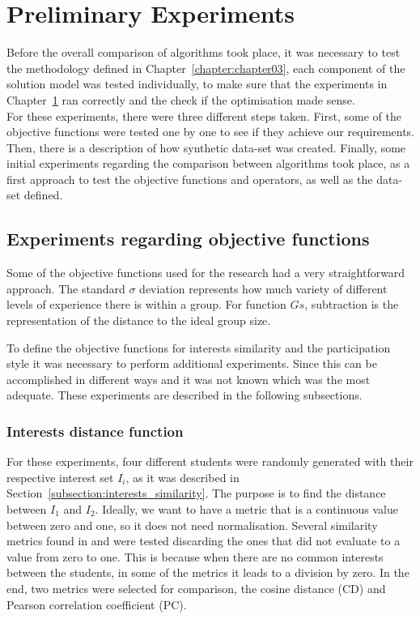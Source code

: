 \chapter{Preliminary Experiments}
\label{chapter:chapter04}

Before the overall comparison of algorithms took place, it was necessary to test the methodology defined in Chapter~\ref{chapter:chapter03}, each component of the solution model was tested individually, to make sure that the experiments in Chapter~\ref{chapter:chapter04} ran correctly and the check if the optimisation made sense.\\

For these experiments, there were three different steps taken. First, some of the objective functions were tested one by one to see if they achieve our requirements. Then, there is a description of how synthetic data-set was created. Finally, some initial experiments regarding the comparison between algorithms took place, as a first approach to test the objective functions and operators, as well as the data-set defined.

\section{Experiments regarding objective functions}

Some of the objective functions used for the research had a very straightforward approach. The standard $\sigma$ deviation represents how much variety of different levels of experience there is within a group. For function $Gs$, subtraction is the representation of the distance to the ideal group size.

To define the objective functions for interests similarity and the participation style it was necessary to perform additional experiments. Since this can be accomplished in different ways and it was not known which was the most adequate. These experiments are described in the following subsections. \\

\subsection{Interests distance function}

For these experiments, four different students were randomly generated with their respective interest set $I_i$, as it was described in Section~\ref{subsection:interests_similarity}. The purpose is to find the distance between $I_1$ and $I_2$. Ideally, we want to have a metric that is a continuous value between zero and one, so it does not need normalisation. Several similarity metrics found in \cite{SeyedShirkhorshidi2015AData} and \cite{Sung-HyukChaComprehensiveFunctions} were tested discarding the ones that did not evaluate to a value from zero to one. This is because when there are no common interests between the students, in some of the metrics it leads to a division by zero. In the end, two metrics were selected for comparison, the cosine distance (CD) and Pearson correlation coefficient (PC).\\

